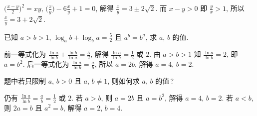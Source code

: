   \beginsolution
    $\Big(\frac{x-y}2\Big)^2=xy$, $\Big(\frac{x}y\Big)-6\frac{x}y+1=0$, 解得 $\frac{x}y=3\pm2\sqrt2$. 而 $x-y>0$ 即 $\frac{y}x>1$, 所以 $\frac{x}y=3+2\sqrt2$.
  \endsolution
  
  \begin{exercise}
    已知 $a>b>1$, $\log_a b+\log_b a=\frac52$ 且 $a^b=b^a$, 求 $a$, $b$ 的值.
  \end{exercise}

  \beginsolution
    前一等式化为 $\frac{\ln a}{\ln b}+\frac{\ln b}{\ln a}=\frac52$, 解得 $\frac{\ln a}{\ln b}=\frac12$ 或 $2$. 由 $a>b>1$ 知 $\frac{\ln a}{\ln b}=2$, 即 $a=b^2$. 后一等式化为 $\frac{\ln a}{\ln b}=\frac{a}b$, 所以 $a=2b$, 解得 $a=4$, $b=2$.
    
    \varexercise 题中若只限制 $a$, $b>0$ 且 $a$, $b\neq 1$, 则如何求 $a$, $b$ 的值\,?
    
    仍有 $\frac{\ln a}{\ln b}=\frac{a}b=\frac12$ 或 $2$. 
    若 $a>b$, 则 $a=2b$ 且 $a=b^2$, 解得 $a=4$, $b=2$. 若 $a<b$, 则 $2a=b$ 且 $a^2=b$, 解得 $a=2$, $b=4$. 
  \endsolution